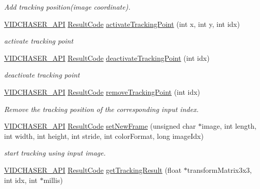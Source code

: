 \begin{DoxyCompactItemize}
\begin{DoxyCompactList}\small\item\em Add tracking position(image coordinate). \end{DoxyCompactList}\item 
\hyperlink{_vid_chaser_a_p_i_8h_abe868bb94e22f611aece5087695f9ef3}{V\+I\+D\+C\+H\+A\+S\+E\+R\+\_\+\+A\+PI} \hyperlink{namespace_vid_chaser_a9a65fd4518380d53654f1af799cbf8ed}{Result\+Code} \hyperlink{namespace_vid_chaser_a80f0b4139cf0864085a72a5808fa6ce3}{activate\+Tracking\+Point} (int x, int y, int idx)
\begin{DoxyCompactList}\small\item\em activate tracking point \end{DoxyCompactList}\item 
\hyperlink{_vid_chaser_a_p_i_8h_abe868bb94e22f611aece5087695f9ef3}{V\+I\+D\+C\+H\+A\+S\+E\+R\+\_\+\+A\+PI} \hyperlink{namespace_vid_chaser_a9a65fd4518380d53654f1af799cbf8ed}{Result\+Code} \hyperlink{namespace_vid_chaser_aa9d6db3ede935229cbb4322665466192}{deactivate\+Tracking\+Point} (int idx)
\begin{DoxyCompactList}\small\item\em deactivate tracking point \end{DoxyCompactList}\item 
\hyperlink{_vid_chaser_a_p_i_8h_abe868bb94e22f611aece5087695f9ef3}{V\+I\+D\+C\+H\+A\+S\+E\+R\+\_\+\+A\+PI} \hyperlink{namespace_vid_chaser_a9a65fd4518380d53654f1af799cbf8ed}{Result\+Code} \hyperlink{namespace_vid_chaser_a3926d98471a7a7f01c2537121b27dd35}{remove\+Tracking\+Point} (int idx)
\begin{DoxyCompactList}\small\item\em Remove the tracking position of the corresponding input index. \end{DoxyCompactList}\item 
\hyperlink{_vid_chaser_a_p_i_8h_abe868bb94e22f611aece5087695f9ef3}{V\+I\+D\+C\+H\+A\+S\+E\+R\+\_\+\+A\+PI} \hyperlink{namespace_vid_chaser_a9a65fd4518380d53654f1af799cbf8ed}{Result\+Code} \hyperlink{namespace_vid_chaser_a1ad3852918f8e289a776bbf23dde0d15}{set\+New\+Frame} (unsigned char $\ast$image, int length, int width, int height, int stride, int color\+Format, long image\+Idx)
\begin{DoxyCompactList}\small\item\em start tracking using input image. \end{DoxyCompactList}\item 
\hyperlink{_vid_chaser_a_p_i_8h_abe868bb94e22f611aece5087695f9ef3}{V\+I\+D\+C\+H\+A\+S\+E\+R\+\_\+\+A\+PI} \hyperlink{namespace_vid_chaser_a9a65fd4518380d53654f1af799cbf8ed}{Result\+Code} \hyperlink{namespace_vid_chaser_a2174022a70838c9a9ea5c14830961a8c}{get\+Tracking\+Result} (float $\ast$transform\+Matrix3x3, int idx, int $\ast$millis)

\end{DoxyCompactItemize}
